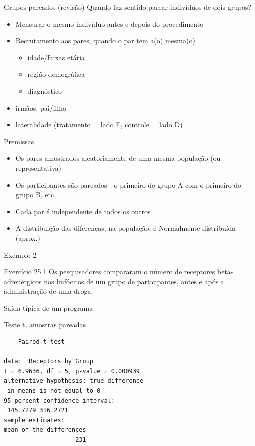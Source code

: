 \documentclass{beamer}
\begin{document}
\begin{frame}{Grupos pareados (revisão)}
Quando faz sentido parear indivíduos de dois grupos?
  \begin{itemize}
  \item Mensurar o \alert{mesmo} indivíduo antes e depois do procedimento
  \item Recrutamento aos pares, quando o par tem a(o) mesma(o)
    \begin{itemize}
    \item idade/faixas etária
    \item região demográfica
    \item diagnóstico
    \end{itemize}
  \item irmãos, pai/filho
  \item lateralidade (tratamento = lado E, controle = lado D)
  \end{itemize}
\end{frame}

\begin{frame}{Premissas}
  \begin{itemize}
  \item Os pares amostrados aleatoriamente de uma mesma população (ou representativa)
  \item Os participantes são pareados - o primeiro do grupo A com o primeiro do grupo B, etc.
  \item Cada par é independente de todos os outros
  \item A distribuição das diferenças, na população, é Normalmente distribuída (aprox.)
  \end{itemize}
\end{frame}

\begin{frame}{Exemplo 2}
  \begin{exampleblock}{Exercício 25.1}
    \small
    Os pesquisadores compararam o número de receptores beta-adrenérgicos nos linfócitos de um grupo de participantes, antes e após a administração de uma droga.

  \end{exampleblock}
\end{frame}

\begin{frame}[fragile]{Saída típica de um programa}
  \begin{exampleblock}{Teste t, amostras pareadas}
    \footnotesize
\begin{verbatim}
	Paired t-test

data:  Receptors by Group
t = 6.9636, df = 5, p-value = 0.000939
alternative hypothesis: true difference
 in means is not equal to 0
95 percent confidence interval:
 145.7279 316.2721
sample estimates:
mean of the differences 
                    231
\end{verbatim}
  \end{exampleblock}
\end{frame}
\end{document}
